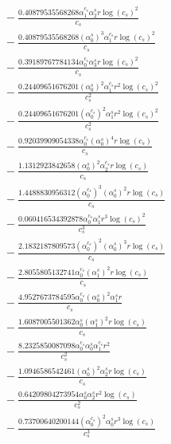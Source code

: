 \documentclass[10pt]{article}
\begin{document}
\begin{align*}
&{}  - \frac{0.40879535568268 \alpha_{1}^{c_s} \alpha_{2}^s r \log{\left(c_{s} \right)}^{2}}{c_{s}} \\
&{}  - \frac{0.40879535568268 \left(\alpha_{0}^s\right)^{3} \alpha_{1}^{c_s} r \log{\left(c_{s} \right)}^{2}}{c_{s}} \\
&{}  - \frac{0.39189767784134 \alpha_{0}^{c_s} \alpha_{3}^s r \log{\left(c_{s} \right)}^{2}}{c_{s}} \\
&{}  - \frac{0.24409651676201 \left(\alpha_{0}^s\right)^{2} \alpha_{1}^{c_s} r^{2} \log{\left(c_{s} \right)}^{2}}{c_{s}^{2}} \\
&{}  - \frac{0.24409651676201 \left(\alpha_{0}^{c_s}\right)^{2} \alpha_{1}^s r^{2} \log{\left(c_{s} \right)}^{2}}{c_{s}^{2}} \\
&{}  - \frac{0.92039909054338 \alpha_{0}^{c_s} \left(\alpha_{0}^s\right)^{4} r \log{\left(c_{s} \right)}}{c_{s}} \\
&{}  - \frac{1.1312923842658 \left(\alpha_{0}^s\right)^{2} \alpha_{2}^{c_s} r \log{\left(c_{s} \right)}}{c_{s}} \\
&{}  - \frac{1.4488830956312 \left(\alpha_{0}^{c_s}\right)^{3} \left(\alpha_{0}^s\right)^{2} r \log{\left(c_{s} \right)}}{c_{s}} \\
&{}  - \frac{0.060416534392878 \alpha_{0}^{c_s} \alpha_{1}^s r^{3} \log{\left(c_{s} \right)}^{2}}{c_{s}^{3}} \\
&{}  - \frac{2.1832187809573 \left(\alpha_{0}^{c_s}\right)^{2} \left(\alpha_{0}^s\right)^{3} r \log{\left(c_{s} \right)}}{c_{s}} \\
&{}  - \frac{2.8055805132741 \alpha_{0}^{c_s} \left(\alpha_{1}^s\right)^{2} r \log{\left(c_{s} \right)}}{c_{s}} \\
&{}  - \frac{4.9527673784595 \alpha_{0}^{c_s} \left(\alpha_{0}^s\right)^{2} \alpha_{1}^s r}{c_{s}} \\
&{}  - \frac{1.6087005501362 \alpha_{0}^s \left(\alpha_{1}^s\right)^{2} r \log{\left(c_{s} \right)}}{c_{s}} \\
&{}  - \frac{8.2325850087098 \alpha_{0}^{c_s} \alpha_{0}^s \alpha_{1}^{c_s} r^{2}}{c_{s}^{2}} \\
&{}  - \frac{1.0946586542461 \left(\alpha_{0}^s\right)^{2} \alpha_{2}^s r \log{\left(c_{s} \right)}}{c_{s}} \\
&{}  - \frac{0.64209804273954 \alpha_{0}^s \alpha_{2}^s r^{2} \log{\left(c_{s} \right)}}{c_{s}^{2}} \\
&{}  - \frac{0.73700640200144 \left(\alpha_{0}^{c_s}\right)^{2} \alpha_{0}^s r^{3} \log{\left(c_{s} \right)}}{c_{s}^{3}} \\

\end{align*}
\end{document}
